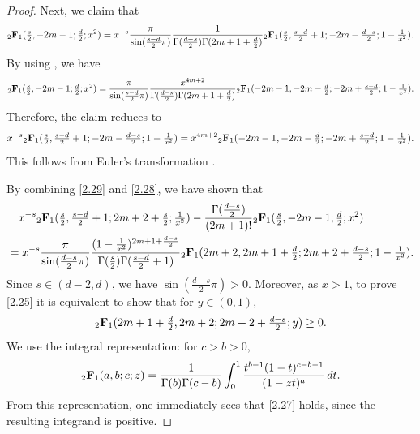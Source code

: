 \documentclass[10pt]{amsart}
\theoremstyle{plain}
\theoremstyle{remark}
\numberwithin{equation}{section}
\begin{document}
\begin{proof}
Next, we claim that 
\begin{align} \label{2.28}
     {}_2\textbf{\textup{F}}_1(\tfrac{s}{2},-2m-1;\tfrac{d}{2};x^2)
= x^{-s}  \frac{ \pi }{ \sin(\frac{s-d}{2}\pi) } \frac{1}{   \Gamma(\tfrac{d-s}{2}) \Gamma(2m+1+\frac{d}{2})} {}_2 \textbf{\textup{F}} _1 ( \tfrac{s}{2},\tfrac{s-d}{2}+1; -2m-\tfrac{d-s}{2}; 1-\tfrac{1}{x^2} ). 
\end{align}
By using \cite[Eq.(15.8.7)]{NIST}, we have 
\begin{align*}
  {}_2\textbf{\textup{F}}_1(\tfrac{s}{2},-2m-1;\tfrac{d}{2};x^2) = \frac{\pi}{ \sin( \frac{s-d}{2}\pi ) }  \frac{ x^{4m+2} }{\Gamma(\frac{d-s}{2})\Gamma(2m+1+\frac{d}{2})}   {}_2 \textbf{\textup{F}} _1(  -2m-1, -2m-\tfrac{d}{2}; -2m+\tfrac{s-d}{2};1-\tfrac{1}{x^2} ). 
\end{align*}
Therefore, the claim reduces to 
\begin{align*}
x^{-s}  {}_2 \textbf{\textup{F}} _1 ( \tfrac{s}{2},\tfrac{s-d}{2}+1; -2m-\tfrac{d-s}{2}; 1-\tfrac{1}{x^2} )= x^{4m+2}  {}_2 \textbf{\textup{F}} _1(  -2m-1, -2m-\tfrac{d}{2}; -2m+\tfrac{s-d}{2};1-\tfrac{1}{x^2} ). 
\end{align*}
This follows from Euler's transformation \cite[Eq.(15.8.1)]{NIST}. 

By combining \eqref{2.29} and \eqref{2.28}, we have shown that 
\begin{align}
\begin{split}
&\quad x^{-s}  {}_2 \textbf{\textup{F}} _1 ( \tfrac{s}{2},\tfrac{s-d}{2}+1; 2m+2+\tfrac{s}{2}; \tfrac{1}{x^2} ) -    \frac{ \Gamma(\frac{d-s}{2})  }{ (2m+1)! }   {}_2\textbf{\textup{F}}_1(\tfrac{s}{2},-2m-1;\tfrac{d}{2};x^2)
\\
&= x^{-s}  \frac{ \pi }{ \sin(\frac{d-s}{2}\pi) } \frac{ (1-\frac{1}{x^2})^{ 2m+1+\frac{d-s}{2} } }{ \Gamma(\tfrac{s}{2}) \Gamma(\tfrac{s-d}{2}+1 ) } {}_2 \textbf{\textup{F}} _1 ( 2m+2, 2m+1+\tfrac{d}{2}; 2m+2+\tfrac{d-s}{2}; 1-\tfrac{1}{x^2} ). 
\end{split}
\end{align}
Since $s \in (d-2,d)$, we have $\sin(\frac{d-s}{2}\pi)>0$. Moreover, as $x>1$, to prove \eqref{2.25} it is equivalent to show that for $y \in (0,1)$,
\begin{equation} \label{2.27}
  {}_2 \textbf{\textup{F}} _1 ( 2m+1+\tfrac{d}{2},2m+2; 2m+2+\tfrac{d-s}{2}; y )\ge 0. 
\end{equation}
We use the integral representation: for $c>b>0,$
\begin{equation} \label{int rep for 2F1}
 {}_2 \textbf{\textup{F}} _1 (a,b;c;z)= \frac{1}{\Gamma(b)\Gamma(c-b)} \int_0^1 \frac{ t^{b-1}(1-t)^{c-b-1} }{ (1-z t)^a }\,dt. 
\end{equation}
From this representation, one immediately sees that \eqref{2.27} holds, since the resulting integrand is positive. 
\end{proof}
\end{document}
